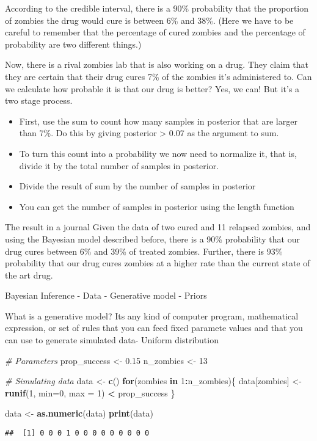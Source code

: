 \documentclass[
]{article}
\newenvironment{Shaded}{\begin{snugshade}}{\end{snugshade}}
\newcommand{\CommentTok}[1]{\textcolor[rgb]{0.56,0.35,0.01}{\textit{#1}}}
\newcommand{\ControlFlowTok}[1]{\textcolor[rgb]{0.13,0.29,0.53}{\textbf{#1}}}
\newcommand{\DataTypeTok}[1]{\textcolor[rgb]{0.13,0.29,0.53}{#1}}
\newcommand{\DecValTok}[1]{\textcolor[rgb]{0.00,0.00,0.81}{#1}}
\newcommand{\FloatTok}[1]{\textcolor[rgb]{0.00,0.00,0.81}{#1}}
\newcommand{\KeywordTok}[1]{\textcolor[rgb]{0.13,0.29,0.53}{\textbf{#1}}}
\newcommand{\NormalTok}[1]{#1}
\newcommand{\OperatorTok}[1]{\textcolor[rgb]{0.81,0.36,0.00}{\textbf{#1}}}
\newcommand{\StringTok}[1]{\textcolor[rgb]{0.31,0.60,0.02}{#1}}
\providecommand{\tightlist}{%
  \setlength{\itemsep}{0pt}\setlength{\parskip}{0pt}}
\begin{document}
According to the credible interval, there is a 90\% probability that the
proportion of zombies the drug would cure is between 6\% and 38\%. (Here
we have to be careful to remember that the percentage of cured zombies
and the percentage of probability are two different things.)

Now, there is a rival zombies lab that is also working on a drug. They
claim that they are certain that their drug cures 7\% of the zombies
it's administered to. Can we calculate how probable it is that our drug
is better? Yes, we can! But it's a two stage process.

\begin{itemize}
\tightlist
\item
  First, use the sum to count how many samples in posterior that are
  larger than 7\%. Do this by giving posterior \textgreater{} 0.07 as
  the argument to sum.
\item
  To turn this count into a probability we now need to normalize it,
  that is, divide it by the total number of samples in posterior.
\item
  Divide the result of sum by the number of samples in posterior
\item
  You can get the number of samples in posterior using the length
  function
\end{itemize}

The result in a journal Given the data of two cured and 11 relapsed
zombies, and using the Bayesian model described before, there is a 90\%
probability that our drug cures between 6\% and 39\% of treated zombies.
Further, there is 93\% probability that our drug cures zombies at a
higher rate than the current state of the art drug.

Bayesian Inference - Data - Generative model - Priors

What is a generative model? Its any kind of computer program,
mathematical expression, or set of rules that you can feed fixed
paramete values and that you can use to generate simulated data- Uniform
distribution

\begin{Shaded}
\begin{Highlighting}[]
\CommentTok{\# Parameters}
\NormalTok{prop\_success <{-}}\StringTok{ }\FloatTok{0.15}
\NormalTok{n\_zombies <{-}}\StringTok{ }\DecValTok{13}

\CommentTok{\# Simulating data}
\NormalTok{data <{-}}\StringTok{ }\KeywordTok{c}\NormalTok{()}
\ControlFlowTok{for}\NormalTok{(zombies }\ControlFlowTok{in} \DecValTok{1}\OperatorTok{:}\NormalTok{n\_zombies)\{}
\NormalTok{  data[zombies] <{-}}\StringTok{ }\KeywordTok{runif}\NormalTok{(}\DecValTok{1}\NormalTok{, }\DataTypeTok{min=}\DecValTok{0}\NormalTok{, }\DataTypeTok{max =} \DecValTok{1}\NormalTok{) }\OperatorTok{<}\StringTok{ }\NormalTok{prop\_success}
\NormalTok{\}}

\NormalTok{data <{-}}\StringTok{ }\KeywordTok{as.numeric}\NormalTok{(data)}
\KeywordTok{print}\NormalTok{(data)}
\end{Highlighting}
\end{Shaded}

\begin{verbatim}
##  [1] 0 0 0 1 0 0 0 0 0 0 0 0 0
\end{verbatim}
\end{document}
